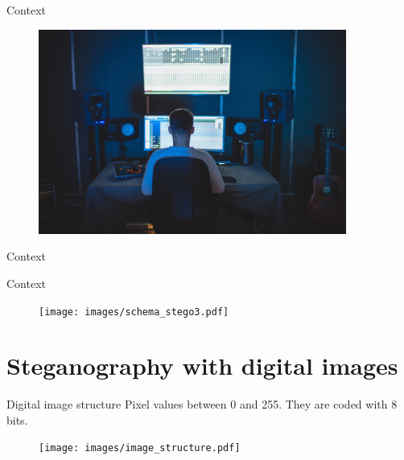 \documentclass[10pt]{beamer}
\begin{document}
\begin{frame}{Context}
 \begin{figure}[h]
    \includegraphics[width=0.9\textwidth]{images/computer.jpg}%
\end{figure}
\end{frame}


\begin{frame}{Context}
\end{frame}


\begin{frame}{Context}
\begin{figure}[h]
\texttt{[image: images/schema\_stego3.pdf]}
\end{figure}
\end{frame}




\section{Steganography with digital images}



\begin{frame}{Digital image structure}
Pixel values between 0 and 255. They are coded with 8 bits.
\begin{figure}[h]
\texttt{[image: images/image\_structure.pdf]}
\end{figure}
\end{frame}
\end{document}
